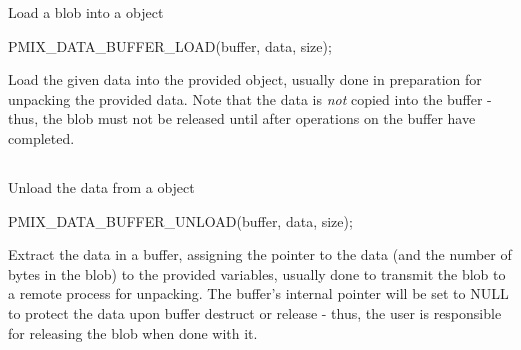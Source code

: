 \summary

Load a blob into a  object

\format

\begin{signature}{2.0}
PMIX_DATA_BUFFER_LOAD(buffer, data, size);
\end{signature}

\begin{arglist}
\end{arglist}

\descr

Load the given data into the provided  object, usually done in preparation for unpacking the provided data. Note that the data is \textit{not} copied into the buffer - thus, the blob must not be released until after operations on the buffer have completed.


\subsection{}

\summary

Unload the data from a  object

\format

\begin{signature}{2.0}
PMIX_DATA_BUFFER_UNLOAD(buffer, data, size);
\end{signature}

\begin{arglist}
\end{arglist}

\descr

Extract the data in a buffer, assigning the pointer to the data (and the number of bytes in the blob) to the provided variables, usually done to transmit the blob to a remote process for unpacking. The buffer's internal pointer will be set to NULL to protect the data upon buffer destruct or release - thus, the user is responsible for releasing the blob when done with it.


